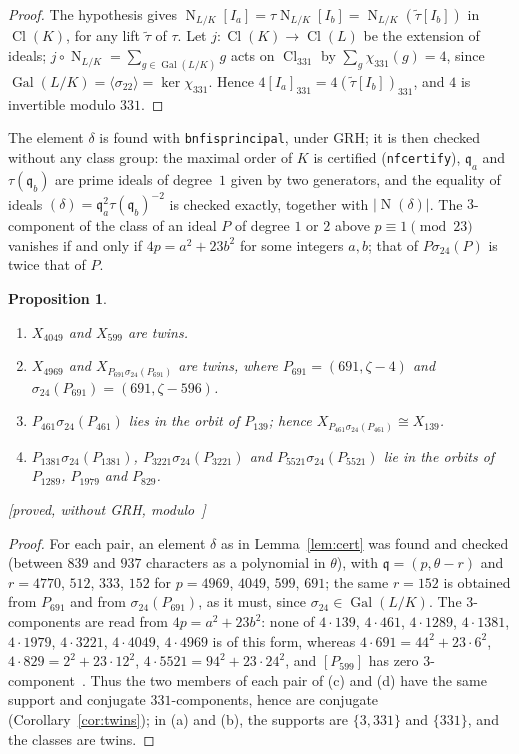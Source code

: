 \documentclass[11pt,a4paper]{amsart}
\theoremstyle{plain}
\newtheorem{proposition}{Proposition}[section]
\theoremstyle{definition}
\newcommand{\q}{\mathfrak{q}}
\DeclareMathOperator{\Nm}{N}
\DeclareMathOperator{\Cl}{Cl}
\DeclareMathOperator{\Gal}{Gal}
\newcommand{\st}[1]{\textup{\textsf{\small[#1]}}}
\begin{document}
\begin{proof}
The hypothesis gives $\Nm_{L/K}[I_a]=\tau\Nm_{L/K}[I_b]=\Nm_{L/K}(\tilde\tau[I_b])$ in $\Cl(K)$, for any lift $\tilde\tau$ of $\tau$. Let $j\colon\Cl(K)\to\Cl(L)$ be the extension of ideals; $j\circ\Nm_{L/K}=\sum_{g\in\Gal(L/K)}g$ acts on $\Cl_{331}$ by $\sum_g\chi_{331}(g)=4$, since $\Gal(L/K)=\langle\sigma_{22}\rangle=\ker\chi_{331}$. Hence $4[I_a]_{331}=4(\tilde\tau[I_b])_{331}$, and $4$ is invertible modulo $331$.
\end{proof}

The element $\delta$ is found with \texttt{bnfisprincipal}, under GRH; it is then checked without any class group: the maximal order of $K$ is certified (\texttt{nfcertify}), $\q_a$ and $\tau(\q_b)$ are prime ideals of degree~$1$ given by two generators, and the equality of ideals $(\delta)=\q_a^2\tau(\q_b)^{-2}$ is checked exactly, together with $|\Nm(\delta)|$. The $3$-component of the class of an ideal $P$ of degree $1$ or $2$ above $p\equiv1\pmod{23}$ vanishes if and only if $4p=a^2+23b^2$ for some integers $a,b$; that of $P\sigma_{24}(P)$ is twice that of $P$.

\begin{proposition}\label{prop:certs}
\begin{enumerate}[label=\textup{(\alph*)}]
\item $X_{4049}$ and $X_{599}$ are twins.
\item $X_{4969}$ and $X_{P_{691}\sigma_{24}(P_{691})}$ are twins, where $P_{691}=(691,\zeta-4)$ and $\sigma_{24}(P_{691})=(691,\zeta-596)$.
\item $P_{461}\sigma_{24}(P_{461})$ lies in the orbit of $P_{139}$; hence $X_{P_{461}\sigma_{24}(P_{461})}\cong X_{139}$.
\item $P_{1381}\sigma_{24}(P_{1381})$, $P_{3221}\sigma_{24}(P_{3221})$ and $P_{5521}\sigma_{24}(P_{5521})$ lie in the orbits of $P_{1289}$, $P_{1979}$ and $P_{829}$.
\end{enumerate}
\st{proved, without GRH, modulo~\cite[Prop.~2.2, 2.5]{Gau26}}
\end{proposition}

\begin{proof}
For each pair, an element $\delta$ as in Lemma~\ref{lem:cert} was found and checked (between $839$ and $937$ characters as a polynomial in $\theta$), with $\q=(p,\theta-r)$ and $r=4770$, $512$, $333$, $152$ for $p=4969$, $4049$, $599$, $691$; the same $r=152$ is obtained from $P_{691}$ and from $\sigma_{24}(P_{691})$, as it must, since $\sigma_{24}\in\Gal(L/K)$. The $3$-components are read from $4p=a^2+23b^2$: none of $4\cdot139$, $4\cdot461$, $4\cdot1289$, $4\cdot1381$, $4\cdot1979$, $4\cdot3221$, $4\cdot4049$, $4\cdot4969$ is of this form, whereas $4\cdot691=44^2+23\cdot6^2$, $4\cdot829=2^2+23\cdot12^2$, $4\cdot5521=94^2+23\cdot24^2$, and $[P_{599}]$ has zero $3$-component~\cite[Prop.~6.7]{Gau26}. Thus the two members of each pair of (c) and (d) have the same support and conjugate $331$-components, hence are conjugate (Corollary~\ref{cor:twins}); in (a) and (b), the supports are $\{3,331\}$ and $\{331\}$, and the classes are twins.
\end{proof}
\end{document}
